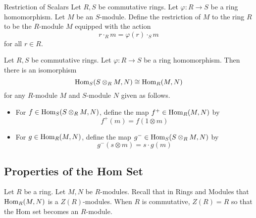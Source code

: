 \documentclass[a4paper]{article}
\begin{document}
\begin{defn}{Restriction of Scalars}{} Let $R,S$ be commutative rings. Let $\varphi:R\to S$ be a ring homomorphism. Let $M$ be an $S$-module. Define the restriction of $M$ to the ring $R$ to be the $R$-module $M$ equipped with the action $$r\cdot_R m=\varphi(r)\cdot_S m$$ for all $r\in R$. 
\end{defn}

\begin{thm}{}{} Let $R,S$ be commutative rings. Let $\varphi:R\to S$ be a ring homomorphism. Then there is an isomorphism $$\operatorname{Hom}_S(S\otimes_R M,N)\cong\operatorname{Hom}_R(M,N)$$ for any $R$-module $M$ and $S$-module $N$ given as follows. 
\begin{itemize}
\item For $f\in\operatorname{Hom}_S(S\otimes_R M,N)$, define the map $f^+\in\operatorname{Hom}_R(M,N)$ by $$f^+(m)=f(1\otimes m)$$
\item For $g\in\operatorname{Hom}_R(M,N)$, define the map $g^-\in\operatorname{Hom}_S(S\otimes_RM,N)$ by $$g^-(s\otimes m)=s\cdot g(m)$$
\end{itemize}
\end{thm}

\subsection{Properties of the Hom Set}
Let $R$ be a ring. Let $M,N$ be $R$-modules. Recall that in Rings and Modules that $\operatorname{Hom}_R(M,N)$ is a $Z(R)$-modules. When $R$ is commutative, $Z(R)=R$ so that the Hom set becomes an $R$-module. 
\end{document}
